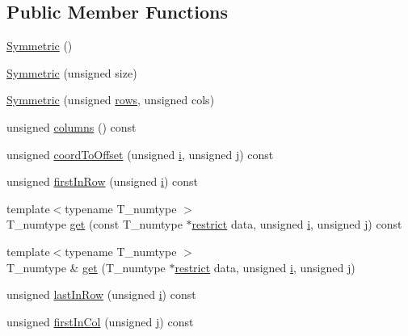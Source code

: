 \subsection*{Public Member Functions}
\begin{DoxyCompactItemize}
\item 
\hyperlink{classSymmetric_a3a75cf3d92f34a1a17a72b6ca8fd1938}{Symmetric} ()
\item 
\hyperlink{classSymmetric_a2310deb51bb0329cd0f792ca2e73c6b0}{Symmetric} (unsigned size)
\item 
\hyperlink{classSymmetric_a732b3a10ee998bcebd0c8a21276b0803}{Symmetric} (unsigned \hyperlink{classSymmetric_af24860e540144cb11f035fa1b156cafe}{rows}, unsigned cols)
\item 
unsigned \hyperlink{classSymmetric_aa32827b7f886c179a8e68320cc71aae7}{columns} () const 
\item 
unsigned \hyperlink{classSymmetric_a317439104ac975dcf99daaab1994a243}{coord\+To\+Offset} (unsigned \hyperlink{indexexpr_8h_aabd77643995707c185e95c8cb2782c81}{i}, unsigned \hyperlink{indexexpr_8h_aa1f3325d66516548e69238097857fa98}{j}) const 
\item 
unsigned \hyperlink{classSymmetric_a485ee108918878fb7fd5048474816edc}{first\+In\+Row} (unsigned \hyperlink{indexexpr_8h_aabd77643995707c185e95c8cb2782c81}{i}) const 
\item 
{\footnotesize template$<$typename T\+\_\+numtype $>$ }\\T\+\_\+numtype \hyperlink{classSymmetric_a4df1e8002c06a983d92e2ab5194b8181}{get} (const T\+\_\+numtype $\ast$\hyperlink{compiler_8h_a080abdcb9c02438f1cd2bb707af25af8}{restrict} data, unsigned \hyperlink{indexexpr_8h_aabd77643995707c185e95c8cb2782c81}{i}, unsigned \hyperlink{indexexpr_8h_aa1f3325d66516548e69238097857fa98}{j}) const 
\item 
{\footnotesize template$<$typename T\+\_\+numtype $>$ }\\T\+\_\+numtype \& \hyperlink{classSymmetric_ad401796621249b91b549962c23ab074b}{get} (T\+\_\+numtype $\ast$\hyperlink{compiler_8h_a080abdcb9c02438f1cd2bb707af25af8}{restrict} data, unsigned \hyperlink{indexexpr_8h_aabd77643995707c185e95c8cb2782c81}{i}, unsigned \hyperlink{indexexpr_8h_aa1f3325d66516548e69238097857fa98}{j})
\item 
unsigned \hyperlink{classSymmetric_a0af7363986c09cfaa4c7396b76961c5a}{last\+In\+Row} (unsigned \hyperlink{indexexpr_8h_aabd77643995707c185e95c8cb2782c81}{i}) const 
\item 
unsigned \hyperlink{classSymmetric_a7d89ac90e5ea60d6901e8dfbd4c1c545}{first\+In\+Col} (unsigned \hyperlink{indexexpr_8h_aa1f3325d66516548e69238097857fa98}{j}) const 

\end{DoxyCompactItemize}

